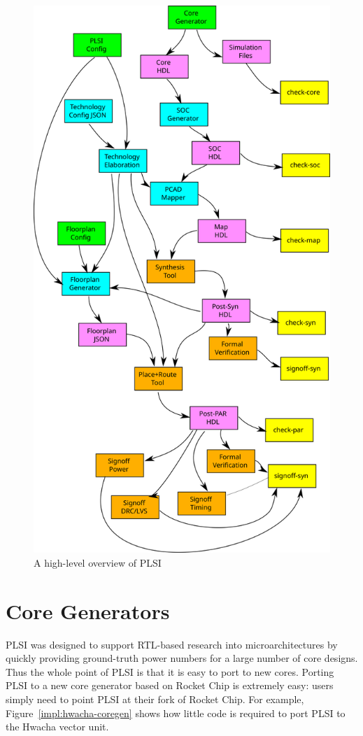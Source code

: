 \documentclass{article}
\begin{document}
\begin{figure}
\begin{center}
\includegraphics[width=0.7\linewidth]{figures/plsi-flow.svg}
\end{center}
\caption{A high-level overview of PLSI}
\label{impl:plsi-flow}
\end{figure}

\section{Core Generators}

PLSI was designed to support RTL-based research into microarchitectures by
quickly providing ground-truth power numbers for a large number of core
designs.  Thus the whole point of PLSI is that it is easy to port to new cores.
Porting PLSI to a new core generator based on Rocket Chip is extremely easy:
users simply need to point PLSI at their fork of Rocket Chip.  For example,
Figure~\ref{impl:hwacha-coregen} shows how little code is required to port PLSI
to the Hwacha vector unit.
\end{document}
